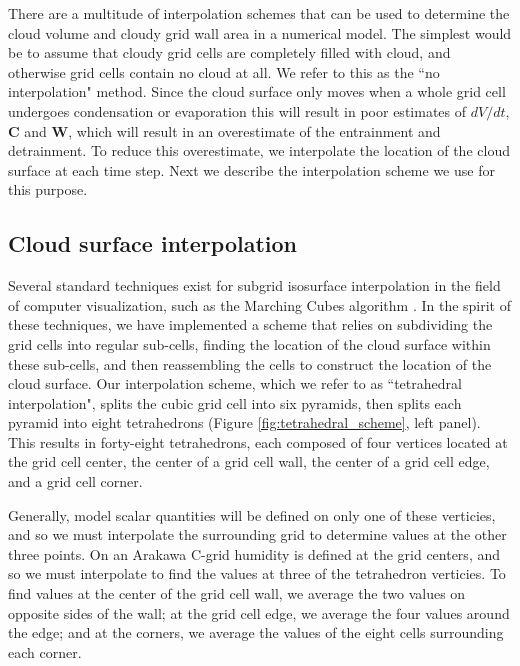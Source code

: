 \documentclass[12pt]{article}
\begin{document}
There are a multitude of interpolation schemes that can be used to determine 
the cloud volume and cloudy grid wall area in a numerical model.  The simplest 
would be to assume that cloudy grid cells are completely filled with cloud, 
and otherwise grid cells contain no cloud at all.  We refer to this as the ``no 
interpolation" method.  Since the cloud surface only moves when a whole grid 
cell undergoes condensation or evaporation this will result in poor estimates 
of $dV/dt$, $\mathbf{C}$ and $\mathbf{W}$, which will result in an overestimate 
of the entrainment and detrainment.  To reduce this overestimate, we 
interpolate the location of the cloud surface at each time step.  Next we 
describe the interpolation scheme we use for this purpose.


\subsection{Cloud surface interpolation}

Several standard techniques exist for subgrid isosurface interpolation in the 
field of computer visualization, such as the Marching Cubes algorithm 
\citep{Lorensen1987}.  In the spirit of these techniques, we have implemented 
a scheme that relies on subdividing the grid cells into regular sub-cells, 
finding the location of the cloud surface within these sub-cells, and then 
reassembling the cells to construct the location of the cloud surface.  Our 
interpolation scheme, which we refer to as ``tetrahedral interpolation", splits 
the cubic grid cell into six pyramids, then splits each pyramid into eight 
tetrahedrons (Figure \ref{fig:tetrahedral_scheme}, left panel).  This results in
forty-eight tetrahedrons, each composed of four vertices located at the grid 
cell center, the center of a grid cell wall, the center of a grid cell edge, 
and a grid cell corner.

Generally, model scalar quantities will be defined on only one of these 
verticies, and so we must interpolate the surrounding grid to determine 
values at the other three points.  On an Arakawa C-grid humidity is defined 
at the grid centers, and so we must interpolate to find the values at three 
of the tetrahedron verticies.  To find values at the center of the grid cell 
wall, we average the two values on opposite sides of the wall; at the grid 
cell edge, we average the four values around the edge; and at the corners, 
we average the values of the eight cells surrounding each corner.
\end{document}
